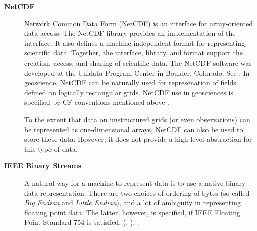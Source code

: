 \begin{description}
\item[\bf NetCDF] Network Common Data Form (NetCDF) is an interface for 
array-oriented data access. The NetCDF library provides an
implementation of the interface. It also defines a 
machine-independent format for representing scientific data. Together,
the interface, library, and format support the creation, access, and
sharing of scientific data. The NetCDF software was developed at the
Unidata Program Center in Boulder, Colorado. See \cite{NetCDF3_UsersGuide_C}.
In geoscience, NetCDF can be naturally used for represenation of fields 
defined on logically rectangular grids. NetCDF use in geosciences is 
specified by CF conventions mentioned above \cite{NetCDF_CF_v1_beta3}. 

To the extent that data on unstructured grids (or even observations) can be 
represented as one-dimensional arrays, NetCDF can also be used to store these 
data. However, it does not provide a high-level abstraction for this type of 
data. 

\item[\bf IEEE Binary Streams]
A natural way for a machine to represent data is to use a native
binary data representation. There are two choices of ordering of bytes
(so-called {\it Big Endian} and {\it Little Endian}), and a lot of
ambiguity in representing floating point data. The latter, however, is
specified, if IEEE Floating Point Standard 754 is satisfied.
(\cite{IEEE-Floating-Point}, \cite{Kahan-IEEE-754}). 
\cite{XML-W3C}.

\end{description}

